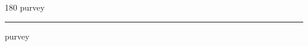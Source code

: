 
\begin{frame}
\begin{center}
\begin{turn}{180}
{\fontsize{2.5cm}{1em}\selectfont purvey}
\end{turn}
\vspace{1em}\par  
\hrule
\vspace{1em}\par  
{\fontsize{2.5cm}{1em}\selectfont purvey}
\end{center}
\end{frame}
